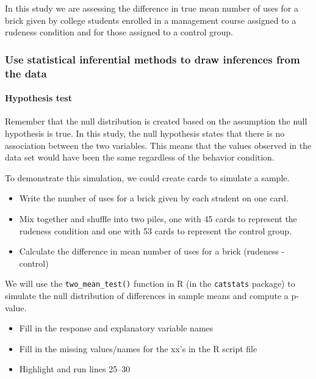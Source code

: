\documentclass[
]{report}
\begin{document}
In this study we are assessing the difference in true mean number of uses for a brick given by college students enrolled in a management course assigned to a rudeness condition and for those assigned to a control group.

\subsubsection*{Use statistical inferential methods to draw inferences from the data}\label{use-statistical-inferential-methods-to-draw-inferences-from-the-data-5}

\paragraph*{Hypothesis test}\label{hypothesis-test-5}

Remember that the null distribution is created based on the assumption the null hypothesis is true. In this study, the null hypothesis states that there is no association between the two variables. This means that the values observed in the data set would have been the same regardless of the behavior condition.

To demonstrate this simulation, we could create cards to simulate a sample.

\begin{itemize}
\item
  Write the number of uses for a brick given by each student on one card.
\item
  Mix together and shuffle into two piles, one with 45 cards to represent the rudeness condition and one with 53 cards to represent the control group.
\item
  Calculate the difference in mean number of uses for a brick (rudeness - control)
\end{itemize}

We will use the \texttt{two\_mean\_test()} function in R (in the \texttt{catstats} package) to simulate the null distribution of differences in sample means and compute a p-value.

\begin{itemize}
\item
  Fill in the response and explanatory variable names
\item
  Fill in the missing values/names for the xx's in the R script file
\item
  Highlight and run lines 25--30
\end{itemize}
\end{document}
